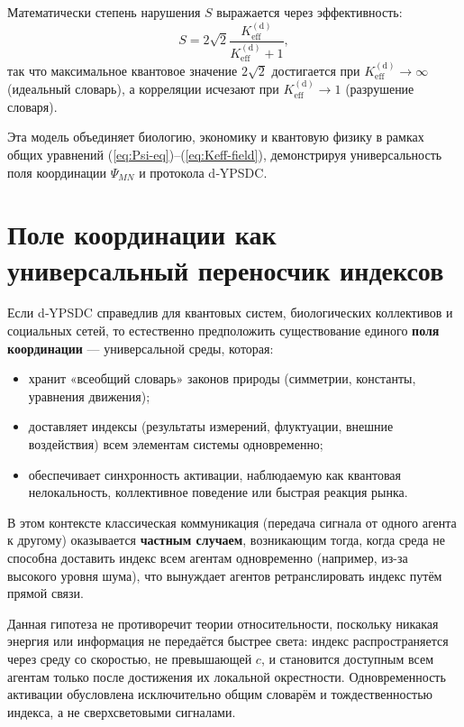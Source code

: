 \documentclass[11pt,a4paper]{article}
\newcommand{\Keff}{K_{\mathrm{eff}}}
\begin{document}
	Математически степень нарушения \(S\) выражается через эффективность:
	\begin{equation}
		S = 2\sqrt{2} \frac{\Keff^{\mathrm{(d)}}}{\Keff^{\mathrm{(d)}} + 1},
	\end{equation}
	так что максимальное квантовое значение \(2\sqrt{2}\) достигается при \(\Keff^{\mathrm{(d)}} \to \infty\) (идеальный словарь), а корреляции исчезают при \(\Keff^{\mathrm{(d)}} \to 1\) (разрушение словаря).
	
	Эта модель объединяет биологию, экономику и квантовую физику в рамках общих уравнений (\ref{eq:Psi-eq})–(\ref{eq:Keff-field}), демонстрируя универсальность поля координации \(\Psi_{MN}\) и протокола d‑YPSDC.
	
	\section{Поле координации как универсальный переносчик индексов}
	
	Если d‑YPSDC справедлив для квантовых систем, биологических коллективов и социальных сетей, то естественно предположить существование единого \textbf{поля координации} — универсальной среды, которая:
	
	\begin{itemize}
		\item хранит «всеобщий словарь» законов природы (симметрии, константы, уравнения движения);
		\item доставляет индексы (результаты измерений, флуктуации, внешние воздействия) всем элементам системы одновременно;
		\item обеспечивает синхронность активации, наблюдаемую как квантовая нелокальность, коллективное поведение или быстрая реакция рынка.
	\end{itemize}
	
	В этом контексте классическая коммуникация (передача сигнала от одного агента к другому) оказывается \textbf{частным случаем}, возникающим тогда, когда среда не способна доставить индекс всем агентам одновременно (например, из-за высокого уровня шума), что вынуждает агентов ретранслировать индекс путём прямой связи.
	
	Данная гипотеза не противоречит теории относительности, поскольку никакая энергия или информация не передаётся быстрее света: индекс распространяется через среду со скоростью, не превышающей \(c\), и становится доступным всем агентам только после достижения их локальной окрестности. Одновременность активации обусловлена исключительно общим словарём и тождественностью индекса, а не сверхсветовыми сигналами.
	
\end{document}
